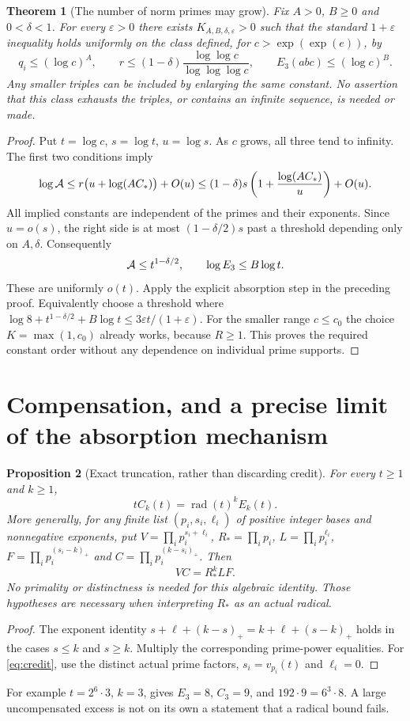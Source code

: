 \documentclass[11pt]{amsart}
\newtheorem{theorem}{Theorem}[section]
\newtheorem{proposition}[theorem]{Proposition}
\theoremstyle{definition}\newtheorem{definition}[theorem]{Definition}
\theoremstyle{remark}\newtheorem{remark}[theorem]{Remark}
\newcommand{\rad}{\operatorname{rad}}\newcommand{\eps}{\varepsilon}
\begin{document}
\begin{theorem}[The number of norm primes may grow]\label{thm:growing}
Fix $A>0$, $B\ge0$ and $0<\delta<1$. For every $\eps>0$ there exists $K_{A,B,\delta,\eps}>0$ such that the standard $1+\eps$ inequality holds uniformly on the class defined, for $c>\exp(\exp(e))$, by
\begin{equation}\label{eq:stratum}
 q_i\le(\log c)^A,\qquad
 r\le(1-\delta)\frac{\log\log c}{\log\log\log c},
 \qquad E_3(abc)\le(\log c)^B.
\end{equation}
Any smaller triples can be included by enlarging the same constant. No assertion that this class exhausts the triples, or contains an infinite sequence, is needed or made.
\end{theorem}
\begin{proof}
Put $t=\log c$, $s=\log t$, $u=\log s$. As $c$ grows, all three tend to infinity. The first two conditions imply
\[
 \log\mathcal A\le r\bigl(u+\log(AC_*)\bigr)+O(u)
 \le(1-\delta)s\left(1+\frac{\log(AC_*)}{u}\right)+O(u).
\]
All implied constants are independent of the primes and their exponents. Since $u=o(s)$, the right side is at most $(1-\delta/2)s$ past a threshold depending only on $A,\delta$. Consequently
\[
 \mathcal A\le t^{1-\delta/2},\qquad
 \log E_3\le B\log t.
\]
These are uniformly $o(t)$. Apply the explicit absorption step in the preceding proof. Equivalently choose a threshold where
$\log8+t^{1-\delta/2}+B\log t\le3\eps t/(1+\eps)$.
For the smaller range $c\le c_0$ the choice $K=\max(1,c_0)$ already works, because $R\ge1$. This proves the required constant order without any dependence on individual prime supports.
\end{proof}

\section{Compensation, and a precise limit of the absorption mechanism}
\begin{proposition}[Exact truncation, rather than discarding credit]\label{prop:credit}
For every $t\ge1$ and $k\ge1$,
\begin{equation}\label{eq:credit}
 t C_k(t)=\rad(t)^k E_k(t).
\end{equation}
More generally, for any finite list $(p_i,s_i,\ell_i)$ of positive integer bases and nonnegative exponents, put $V=\prod_i p_i^{s_i+\ell_i}$, $R_*=\prod_i p_i$, $L=\prod_i p_i^{\ell_i}$, $F=\prod_i p_i^{(s_i-k)_+}$ and $C=\prod_i p_i^{(k-s_i)_+}$. Then
\[
 VC=R_*^k LF.
\]
No primality or distinctness is needed for this algebraic identity. Those hypotheses are necessary when interpreting $R_*$ as an actual radical.
\end{proposition}
\begin{proof}
The exponent identity
$s+\ell+(k-s)_+=k+\ell+(s-k)_+$ holds in the cases $s\le k$ and $s\ge k$. Multiply the corresponding prime-power equalities. For \eqref{eq:credit}, use the distinct actual prime factors, $s_i=v_{p_i}(t)$ and $\ell_i=0$.
\end{proof}
For example $t=2^6\cdot3$, $k=3$, gives $E_3=8$, $C_3=9$, and $192\cdot9=6^3\cdot8$. A large uncompensated excess is not on its own a statement that a radical bound fails.
\end{document}

